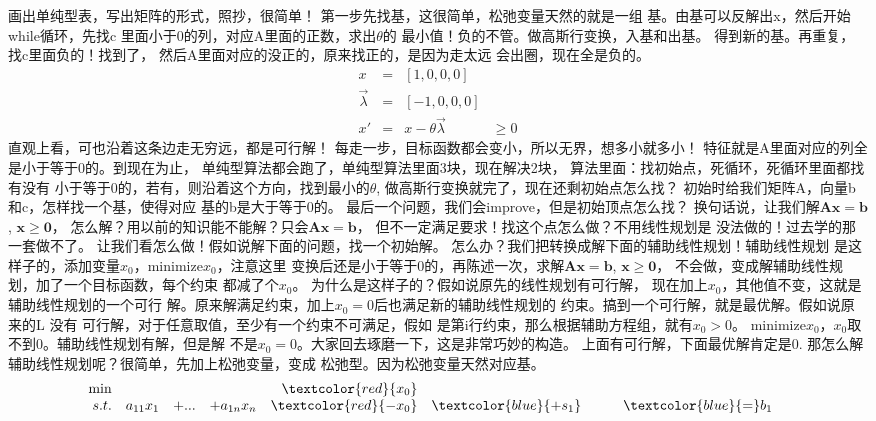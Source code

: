 {{}
{
	画出单纯型表，写出矩阵的形式，照抄，很简单！
	第一步先找基，这很简单，松弛变量天然的就是一组
	基。由基可以反解出x，然后开始while循环，先找c
	里面小于0的列，对应A里面的正数，求出$\theta$的
	最小值！负的不管。做高斯行变换，入基和出基。
	得到新的基。再重复，找c里面负的！找到了，
	然后A里面对应的没正的，原来找正的，是因为走太远
	会出圈，现在全是负的。
	\[
	\begin{array}{llll}
	x & = & [1, 0, 0, 0] &\\
	\overrightarrow{\lambda} & = & [-1, 0, 0, 0] &\\
	x' & = & x - \theta\overrightarrow{\lambda} &\geq 0
	\end{array}
	\]
	直观上看，可也沿着这条边走无穷远，都是可行解！
	每走一步，目标函数都会变小，所以无界，想多小就多小！
	特征就是A里面对应的列全是小于等于0的。到现在为止，
	单纯型算法都会跑了，单纯型算法里面3块，现在解决2块，
	算法里面：找初始点，死循环，死循环里面都找有没有
	小于等于0的，若有，则沿着这个方向，找到最小的$\theta$,
	做高斯行变换就完了，现在还剩初始点怎么找？
	初始时给我们矩阵A，向量b和c，怎样找一个基，使得对应
	基的b是大于等于0的。
}
{
	最后一个问题，我们会improve，但是初始顶点怎么找？
	换句话说，让我们解$\mathbf{Ax = b}$, $\mathbf{x \geq 0}$，
	怎么解？用以前的知识能不能解？只会$\mathbf{Ax = b}$，
	但不一定满足要求！找这个点怎么做？不用线性规划是
	没法做的！过去学的那一套做不了。
}
{
	让我们看怎么做！假如说解下面的问题，找一个初始解。
	怎么办？我们把转换成解下面的辅助线性规划！辅助线性规划
	是这样子的，添加变量$x_0$，minimize$x_0$，注意这里
	变换后还是小于等于0的，再陈述一次，求解$\mathbf{Ax = b}$, $\mathbf{x \geq 0}$，
	不会做，变成解辅助线性规划，加了一个目标函数，每个约束
	都减了个$x_0$。
}
{
	为什么是这样子的？假如说原先的线性规划有可行解，
	现在加上$x_0$，其他值不变，这就是辅助线性规划的一个可行
	解。原来解满足约束，加上$x_0 = 0$后也满足新的辅助线性规划的
	约束。搞到一个可行解，就是最优解。假如说原来的L 没有
	可行解，对于任意取值，至少有一个约束不可满足，假如
	是第i行约束，那么根据辅助方程组，就有$x_0 > 0$。
	minimize$x_0$，$x_0$取不到0。辅助线性规划有解，但是解
	不是$x_0 = 0$。大家回去琢磨一下，这是非常巧妙的构造。
	上面有可行解，下面最优解肯定是0.
}
{
	那怎么解辅助线性规划呢？很简单，先加上松弛变量，变成
	松弛型。因为松弛变量天然对应基。
}
{
	\[
	\begin{array}{rrcrrrrrrrrrl}
	\min &    & &   &  \textcolor{red}{x_0}                                   &          &        &         &         & \\
	s.t. & a_{11}x_1 &+ ... &+a_{1n}x_n   &\textcolor{red}{-x_0}& \textcolor{blue}{+ s_1}&       &         &\textcolor{blue}{=}  b_1 &  \\

\end{array}\]}}
